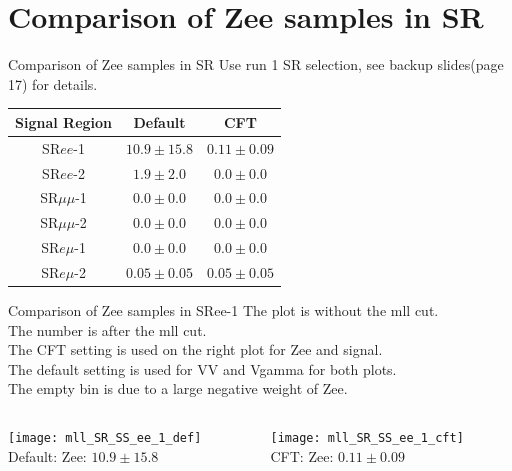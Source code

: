 \documentclass[mathserif,serif]{beamer}
\begin{document}
\section{Comparison of Zee samples in SR}
\begin{frame}
\sectionpage
\end{frame}

\begin{frame}{Comparison of Zee samples in SR}
Use run 1 SR selection, see backup slides(page 17) for details.
\begin{tabular}{|c|c|c|}
\hline
Signal Region & Default & CFT \\
\hline
SR$ee$-1     & $10.9\pm15.8$ & $0.11\pm0.09$ \\
\hline
SR$ee$-2     & $1.9\pm2.0$ & $0.0\pm0.0$ \\
\hline
SR$\mu\mu$-1 & $0.0\pm0.0$ & $0.0\pm0.0$ \\
\hline
SR$\mu\mu$-2 & $0.0\pm0.0$ & $0.0\pm0.0$ \\
\hline
SR$e\mu$-1   & $0.0\pm0.0$ & $0.0\pm0.0$ \\
\hline
SR$e\mu$-2   & $0.05\pm0.05$ & $0.05\pm0.05$ \\
\hline
\end{tabular}
\end{frame}

\begin{frame}{Comparison of Zee samples in SRee-1}
The plot is without the mll cut. \\
The number is after the mll cut. \\
The CFT setting is used on the right plot for Zee and signal. \\
The default setting is used for VV and Vgamma for both plots. \\
The empty bin is due to a large negative weight of Zee.
\begin{columns}

\begin{column}{0.5\textwidth}
\begin{center}
\texttt{[image: mll\_SR\_SS\_ee\_1\_def]} \\
Default: Zee: $10.9\pm15.8$
\end{center}
\end{column}

\begin{column}{0.5\textwidth}
\begin{center}
\texttt{[image: mll\_SR\_SS\_ee\_1\_cft]} \\
CFT: Zee: $0.11\pm0.09$
\end{center}
\end{column}

\end{columns}

\end{frame}
\end{document}
